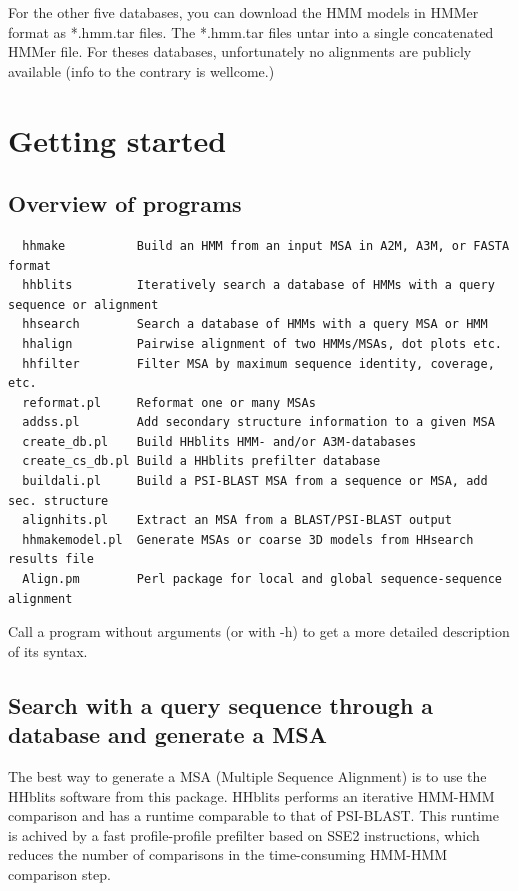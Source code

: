 \documentclass[11pt,a4paper]{article}
\begin{document}
For the other five databases, you can download the HMM models in HMMer format as 
*.hmm.tar files. The *.hmm.tar files untar into a single concatenated HMMer file. 
For theses databases, unfortunately no alignments are publicly available (info to the 
contrary is wellcome.) 


\section{Getting started}

\subsection{Overview of programs}

\small 
\begin{verbatim}
  hhmake          Build an HMM from an input MSA in A2M, A3M, or FASTA format 
  hhblits         Iteratively search a database of HMMs with a query sequence or alignment
  hhsearch        Search a database of HMMs with a query MSA or HMM
  hhalign         Pairwise alignment of two HMMs/MSAs, dot plots etc.
  hhfilter        Filter MSA by maximum sequence identity, coverage, etc.  
  reformat.pl     Reformat one or many MSAs
  addss.pl        Add secondary structure information to a given MSA
  create_db.pl    Build HHblits HMM- and/or A3M-databases
  create_cs_db.pl Build a HHblits prefilter database
  buildali.pl     Build a PSI-BLAST MSA from a sequence or MSA, add sec. structure
  alignhits.pl    Extract an MSA from a BLAST/PSI-BLAST output
  hhmakemodel.pl  Generate MSAs or coarse 3D models from HHsearch results file	
  Align.pm        Perl package for local and global sequence-sequence alignment
\end{verbatim} 
\normalsize

Call a program without arguments (or with -h) to get a more detailed description of 
its syntax.


\subsection{Search with a query sequence through a database and generate a MSA}

The best way to generate a MSA (Multiple Sequence Alignment) is to use the HHblits software 
from this package. HHblits performs an iterative HMM-HMM comparison and has a runtime comparable 
to that of PSI-BLAST. This runtime is achived by a fast profile-profile prefilter based on SSE2 
instructions, which reduces the number of comparisons in the time-consuming HMM-HMM comparison 
step.
\end{document}
